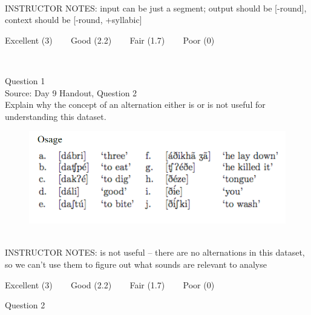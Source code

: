 \documentclass[12pt]{article}
\begin{document}
~\\
INSTRUCTOR NOTES: input can be just a segment; output should be [-round], context should be [-round, +syllabic]


\vfill
Excellent (3) ~~~ Good (2.2) ~~~ Fair (1.7) ~~~ Poor (0)
\newpage

\begin{center}
\textbf{{\color{red}{\HUGE END OF EXAM}}}\\

\end{center}
\newpage

\begin{center}
\textbf{{\color{blue}{\HUGE START OF EXAM\\}}}

\textbf{{\color{blue}{\HUGE Student ID: 2358\\}}}

\textbf{{\color{blue}{\HUGE 4:00 - 4:20 PM\\}}}

\end{center}
\newpage

{\large Question 1}\\

Source: Day 9 Handout, Question 2\\

Explain why the concept of an alternation either is or is not useful for understanding this dataset.\\

\begin{figure}[H]
\includegraphics{../images/osage.png}
\end{figure}

~\\
INSTRUCTOR NOTES: is not useful -- there are no alternations in this dataset, so we can't use them to figure out what sounds are relevant to analyse


\vfill
Excellent (3) ~~~ Good (2.2) ~~~ Fair (1.7) ~~~ Poor (0)
\newpage

{\large Question 2}\\
\end{document}
